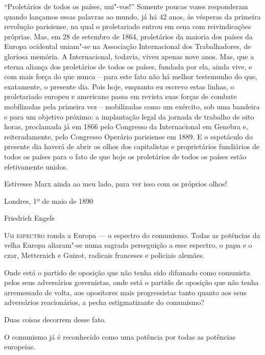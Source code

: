  “Proletários de todos os países, uni"-vos!” Somente poucas vozes
responderam quando lançamos essas palavras ao mundo, já há 42 anos, às vésperas da primeira revolução parisiense, na qual o
proletariado entrou em cena com reivindicações próprias. Mas, em 28 de
setembro de 1864, proletários da maioria dos países da Europa ocidental
uniam"-se na Associação Internacional dos Trabalhadores, de gloriosa
memória. A Internacional, todavia, viveu apenas nove anos. Mas, que a
eterna aliança dos proletários de todos os países, fundada por ela,
ainda vive, e com mais força do que nunca – para este fato não há
melhor testemunho do que, exatamente, o presente dia. Pois hoje, enquanto
eu escrevo estas linhas, o proletariado europeu e americano passa em
revista suas forças de combate mobilizadas pela primeira vez –
mobilizadas como um exército, sob uma bandeira e para um objetivo
próximo: a implantação legal da jornada de trabalho de oito horas,
proclamada já em 1866 pelo Congresso da Internacional em Genebra e,
reiteradamente, pelo Congresso Operário parisiense em 1889. E o
espetáculo do presente dia haverá de abrir os olhos dos capitalistas e
proprietários fundiários de todos os países para o fato de que hoje os
proletários de todos os países estão efetivamente unidos.

Estivesse Marx ainda ao meu lado, para ver isso com os próprios olhos!
\smallskip

\hfill Londres, 1º de maio de 1890

\hfill Friedrich Engels




\setcounter{secnumdepth}{4} %
\setcounter{chapter}{1}


\textsc{Um espectro} ronda a Europa  ---  o espectro do comunismo. Todas as 
potências da velha Europa aliaram"-se numa sagrada perseguição a esse 
espectro, o papa e o czar, Metternich e Guizot, radicais franceses e policiais alemães.

Onde está o partido de oposição que não tenha sido difamado como
comunista pelos seus adversários governistas, onde está o partido de
oposição que não tenha arremessado de volta, aos opositores mais
progressistas tanto quanto aos seus adversários reacionários, a pecha
estigmatizante do comunismo?

Duas coisas decorrem desse fato.

O comunismo já é reconhecido como uma potência por todas as potências
europeias.

